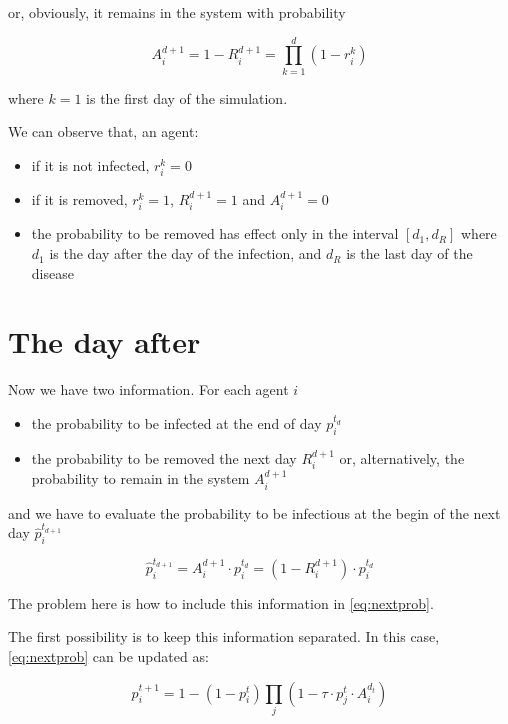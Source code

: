 \documentclass[12pt, a4paper]{article}
\newcommand{\expr}[1]{\left(#1\right)}
\begin{document}
or, obviously, it remains in the system with probability

\begin{equation}
     A_i^{d+1} = 1 - R_i^{d+1} = \prod_{k=1}^{d}(1-r^k_i)
\end{equation}

where $k=1$ is the first day of the simulation.

We can observe that, an agent:
\begin{itemize}
    \item if it is not infected, $r^k_i = 0$
    \item if it is removed, $r^k_i = 1$, $R_i^{d+1} = 1$ and $A_i^{d+1} = 0$
    \item the probability to be removed has effect only in the interval $[d_1, d_R]$ where $d_1$ is the day after the day of the infection, and $d_R$ is the last day of the disease
\end{itemize}


\section{The day after}

Now we have two information. For each agent $i$

\begin{itemize}
    \item the probability to be infected at the end of day $p_i^{t_d}$
    \item the probability to be removed the next day $R_i^{d+1}$ or, alternatively, the probability to remain in the system $A_i^{d+1}$
\end{itemize}

and we have to evaluate the probability to be infectious at the begin of the next day $\hat{p}_i^{t_{d+1}}$

\begin{equation}
     \hat{p}_i^{t_{d+1}} = A_i^{d+1}\cdot{p_i^{t_d}} = \expr{1 - R_i^{d+1}}\cdot{p_i^{t_d}}
\end{equation}

The problem here is how to include this information in \ref{eq:nextprob}.

The first possibility is to keep this information separated. In this case, \ref{eq:nextprob} can be updated as:

\begin{equation}
     p_{i}^{t+1} = 1 - \expr{1 - p_i^t} \prod_{j}\expr{1 - \tau{}\cdot{p_j^t}\cdot{A_i^{d_t}}}
\end{equation}
\end{document}

